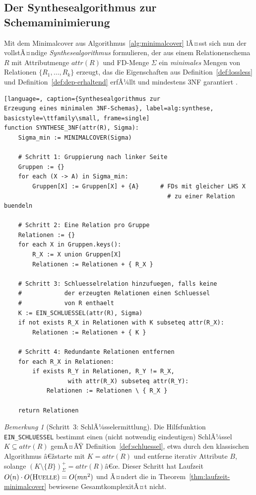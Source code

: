 ﻿\documentclass[a4paper,12pt]{report}
\theoremstyle{definition}
\theoremstyle{remark}
\newtheorem{remark}{Bemerkung}[chapter]
\newcommand{\att}{\mathit{attr}}
\begin{document}
\subsection{Der Synthesealgorithmus zur Schemaminimierung}

Mit dem Minimalcover aus Algorithmus~\ref{alg:minimalcover} lÃ¤sst sich
nun der vollstÃ¤ndige \emph{Synthesealgorithmus} formulieren, der aus
einem Relationenschema $R$ mit Attributmenge $\att(R)$ und FD-Menge
$\Sigma$ ein \emph{minimales} Mengen von Relationen $\{R_1,\ldots,R_k\}$
erzeugt, das die Eigenschaften aus Definition~\ref{def:lossless} und
Definition~\ref{def:dep-erhaltend} erfÃ¼llt und mindestens 3NF
garantiert \cite{Ullman1988,Date2003}.

\begin{lstlisting}[language=, caption={Synthesealgorithmus zur
Erzeugung eines minimalen 3NF-Schemas}, label=alg:synthese,
basicstyle=\ttfamily\small, frame=single]
function SYNTHESE_3NF(attr(R), Sigma):
    Sigma_min := MINIMALCOVER(Sigma)

    # Schritt 1: Gruppierung nach linker Seite
    Gruppen := {}
    for each (X -> A) in Sigma_min:
        Gruppen[X] := Gruppen[X] + {A}      # FDs mit gleicher LHS X
                                              # zu einer Relation buendeln

    # Schritt 2: Eine Relation pro Gruppe
    Relationen := {}
    for each X in Gruppen.keys():
        R_X := X union Gruppen[X]
        Relationen := Relationen + { R_X }

    # Schritt 3: Schluesselrelation hinzufuegen, falls keine
    #            der erzeugten Relationen einen Schluessel
    #            von R enthaelt
    K := EIN_SCHLUESSEL(attr(R), Sigma)
    if not exists R_X in Relationen with K subseteq attr(R_X):
        Relationen := Relationen + { K }

    # Schritt 4: Redundante Relationen entfernen
    for each R_X in Relationen:
        if exists R_Y in Relationen, R_Y != R_X,
                  with attr(R_X) subseteq attr(R_Y):
            Relationen := Relationen \ { R_X }

    return Relationen
\end{lstlisting}

\begin{remark}[Schritt~3: SchlÃ¼sselermittlung]
Die Hilfsfunktion \texttt{EIN\_SCHLUESSEL} bestimmt einen
(nicht notwendig eindeutigen) SchlÃ¼ssel $K\subseteq\att(R)$ gemÃ¤ÃŸ
Definition~\ref{def:schluessel}, etwa durch den klassischen Algorithmus
â€žstarte mit $K=\att(R)$ und entferne iterativ Attribute $B$, solange
$(K\setminus\{B\})^+_\Sigma=\att(R)$â€œ. Dieser Schritt hat
Laufzeit $O(n)\cdot O(\textsc{Huelle})=O(mn^2)$ und Ã¤ndert die in
Theorem~\ref{thm:laufzeit-minimalcover} bewiesene GesamtkomplexitÃ¤t
nicht.
\end{remark}
\end{document}
